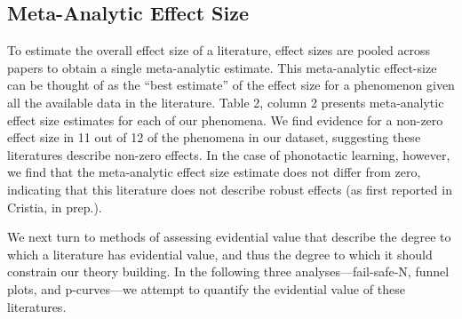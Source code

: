 \documentclass[english,floatsintext,man]{apa6}
\theoremstyle{definition}
\theoremstyle{definition}
\theoremstyle{remark}
\begin{document}
\subsection{Meta-Analytic Effect Size}\label{meta-analytic-effect-size}

To estimate the overall effect size of a literature, effect sizes are
pooled across papers to obtain a single meta-analytic estimate. This
meta-analytic effect-size can be thought of as the \enquote{best
estimate} of the effect size for a phenomenon given all the available
data in the literature. Table 2, column 2 presents meta-analytic effect
size estimates for each of our phenomena. We find evidence for a
non-zero effect size in 11 out of 12 of the phenomena in our dataset,
suggesting these literatures describe non-zero effects. In the case of
phonotactic learning, however, we find that the meta-analytic effect
size estimate does not differ from zero, indicating that this literature
does not describe robust effects (as first reported in Cristia, in
prep.).

We next turn to methods of assessing evidential value that describe the
degree to which a literature has evidential value, and thus the degree
to which it should constrain our theory building. In the following three
analyses---fail-safe-N, funnel plots, and p-curves---we attempt to
quantify the evidential value of these literatures.
\end{document}
